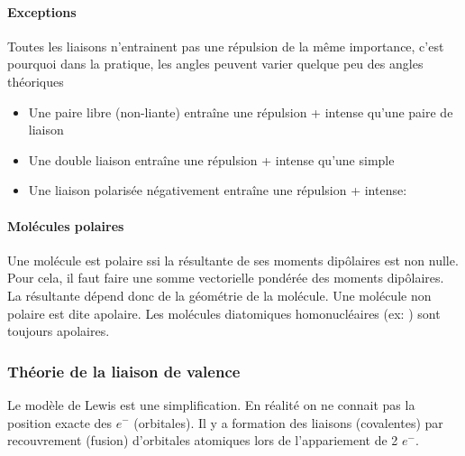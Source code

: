 \paragraph{Exceptions}
Toutes les liaisons n'entrainent pas une répulsion de la même importance,
c'est pourquoi dans la pratique,
les angles peuvent varier quelque peu des angles théoriques
\begin{itemize}
  \item Une paire libre (non-liante) entraîne une répulsion + intense qu'une paire de liaison
  \item Une double liaison entraîne une répulsion + intense qu'une simple
  \item Une liaison polarisée négativement entraîne une répulsion + intense:
    \begin{center}
    \end{center}
\end{itemize}

\paragraph{Molécules polaires}
Une molécule est polaire ssi la résultante de ses moments dipôlaires est non nulle.
Pour cela, il faut faire une somme vectorielle pondérée des moments dipôlaires.
La résultante dépend donc de la géométrie de la molécule.
Une molécule non polaire est dite apolaire.
Les molécules diatomiques homonucléaires (ex: ) sont toujours apolaires.

\subsubsection{Théorie de la liaison de valence}
Le modèle de Lewis est une simplification.
En réalité on ne connait pas la position exacte des $e^-$ (orbitales).
Il y a formation des liaisons (covalentes) par recouvrement (fusion) d'orbitales atomiques lors de l'appariement de 2 $e^-$.

